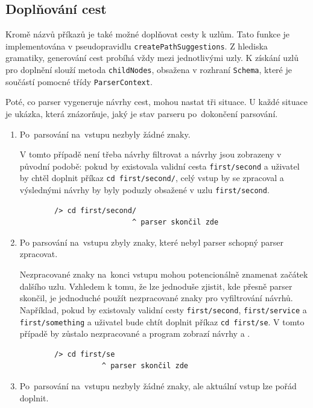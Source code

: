 \documentclass[thesis=B,czech,hidelinks]{FITthesis}[2019/03/06]
\begin{document}
\subsection{Doplňování cest}
Kromě názvů příkazů je také možné doplňovat cesty k uzlům. Tato funkce je implementována v pseudopravidlu \texttt{createPathSuggestions}. Z hlediska gramatiky, generování cest probíhá vždy mezi jednotlivými uzly. K získání uzlů pro doplnění slouží metoda \texttt{childNodes}, obsažena v rozhraní \texttt{Schema}, které je součástí pomocné třídy \texttt{ParserContext}.

Poté, co parser vygeneruje návrhy cest, mohou nastat tři situace. U každé situace je ukázka, která znázorňuje, jaký je stav parseru po~dokončení parsování.
\begin{enumerate}
    \item Po~parsování na~vstupu nezbyly žádné znaky.

        V tomto případě není třeba návrhy filtrovat a návrhy jsou zobrazeny v původní podobě: pokud by existovala validní cesta \texttt{first/second} a uživatel by chtěl doplnit příkaz \texttt{cd first/second/}, celý vstup by se zpracoval a výslednými návrhy by byly poduzly obsažené v uzlu \texttt{first/second}.
        \begin{verbatim}
        /> cd first/second/
                          ^ parser skončil zde
        \end{verbatim}
    \item Po parsování na~vstupu zbyly znaky, které nebyl parser schopný parser zpracovat.

        Nezpracované znaky na~konci vstupu mohou potencionálně znamenat začátek dalšího uzlu. Vzhledem k tomu, že lze jednoduše zjistit, kde přesně parser skončil, je jednoduché použít nezpracované znaky pro vyfiltrování návrhů. Například, pokud by existovaly validní cesty \texttt{first/second}, \texttt{first/service} a \texttt{first/something} a uživatel bude chtít doplnit příkaz \texttt{cd first/se}. V tomto případě by  zůstalo nezpracované a program zobrazí návrhy  a .
        \begin{verbatim}
        /> cd first/se
                   ^ parser skončil zde
        \end{verbatim}
    \item Po~parsování na~vstupu nezbyly žádné znaky, ale aktuální vstup lze pořád doplnit.


\end{enumerate}
\end{document}
